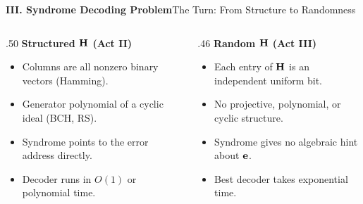 \begin{frame}{\textbf{III. Syndrome Decoding Problem}}{The Turn: From Structure to Randomness}
\small
\begin{columns}[T,onlytextwidth]
\begin{column}{.50\textwidth}
\textcolor{TealDarkCyan}{\textbf{Structured $\mathbf{H}$ (Act II)}}
\begin{itemize}
  \item Columns are all nonzero binary vectors (Hamming).
  \item Generator polynomial of a cyclic ideal (BCH, RS).
  \item Syndrome points to the error address directly.
  \item Decoder runs in $O(1)$ or polynomial time.
\end{itemize}
\end{column}
\begin{column}{.46\textwidth}
\textcolor{TealDarkCyan}{\textbf{Random $\mathbf{H}$ (Act III)}}
\begin{itemize}
  \item Each entry of $\mathbf{H}$ is an independent uniform bit.
  \item No projective, polynomial, or cyclic structure.
  \item Syndrome gives no algebraic hint about $\mathbf{e}$.
  \item Best decoder takes exponential time.
\end{itemize}
\end{column}
\end{columns}
\bigskip
\begin{center}
\end{center}
\end{frame}

